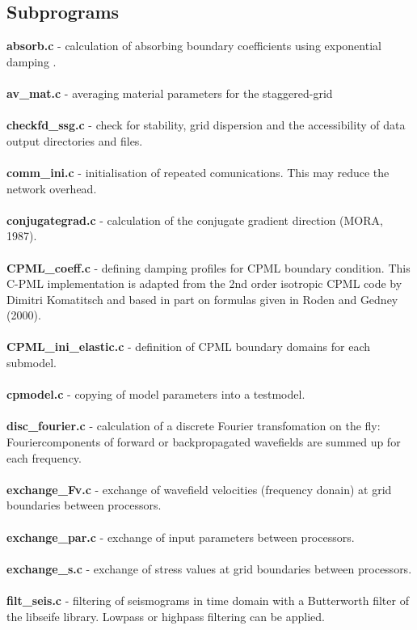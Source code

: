 \subsection*{Subprograms}
\textbf{absorb.c} - calculation of absorbing boundary coefficients using exponential damping \citep{Cer85}.\\
\\
\textbf{av\_mat.c} - averaging material parameters for the staggered-grid\\
\\
\textbf{checkfd\_ssg.c} - check for stability, grid dispersion and the accessibility of data output directories and files. \\
\\
\textbf{comm\_ini.c} - initialisation of repeated comunications. This may reduce the network overhead.\\
\\
\textbf{conjugategrad.c} - calculation of the conjugate gradient direction (MORA, 1987).\\
\\
\textbf{CPML\_coeff.c} - defining damping profiles for CPML boundary condition. This C-PML implementation is adapted from the 2nd order isotropic CPML code
 by Dimitri Komatitsch and based in part on formulas given in Roden and Gedney (2000). \\
\\
\textbf{CPML\_ini\_elastic.c} - definition of CPML boundary domains for each submodel.\\
\\
\textbf{cpmodel.c} - copying of model parameters into a testmodel.\\
\\
\textbf{disc\_fourier.c} - calculation of a discrete Fourier transfomation on the fly: Fouriercomponents of forward or backpropagated wavefields are summed up for each frequency.\\
\\
\textbf{exchange\_Fv.c} - exchange of wavefield velocities (frequency donain) at grid boundaries between processors.\\
\\
\textbf{exchange\_par.c} - exchange of input parameters between processors.\\
\\
\textbf{exchange\_s.c} - exchange of stress values at grid boundaries between processors.\\
\\
\textbf{filt\_seis.c} - filtering of seismograms in time domain with a Butterworth filter of the libseife library. Lowpass or highpass filtering can be applied.  \\
